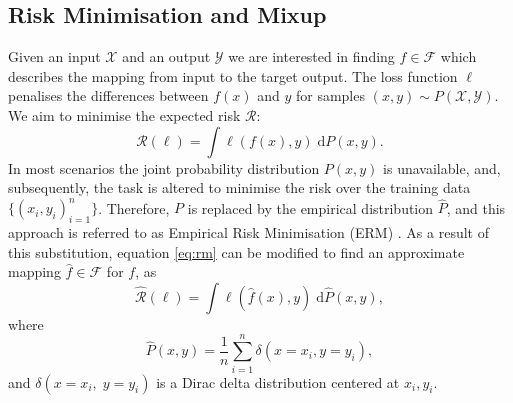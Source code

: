 \documentclass{article}
\begin{document}
\subsection{Risk Minimisation and Mixup}
Given an input $\mathcal{X}$ and an output $\mathcal{Y}$ we are interested in finding $f \in \mathcal{F}$ which describes the mapping from input to the target output. The loss function $\ell$ penalises the differences between $f(x)$ and $y$ for samples $(x, y) \sim P(\mathcal{X}, \mathcal{Y})$. We aim to minimise the expected risk $\mathcal{R}$:
\begin{equation}
\mathcal{R}(\ell) = \int \ell(f(x), y)\; \mathrm{d}P(x, y).
\label{eq:rm}
\end{equation}
In most scenarios the joint probability distribution $P(x,y)$ is unavailable, and, subsequently, the task is altered to minimise the risk over the training data $\{(x_i,y_i)_{i=1}^{n}\}$. Therefore, $P$
is replaced by the empirical distribution $\hat{P}$, and this approach is referred to as Empirical Risk Minimisation (ERM) \cite{erm}. As a result of this substitution, equation \eqref{eq:rm} can be modified to find an approximate mapping $\hat{f} \in \mathcal{F}$ for $f$, as
\begin{equation}
\hat{\mathcal{R}}(\ell) = \int \ell(\hat{f}(x), y)\; \mathrm{d}\hat{P}(x, y),
\label{eq:erm}
\end{equation}
where
\begin{equation}
\hat{P}(x, y) = \frac{1}{n} \sum_{i=1}^{n} \delta(x=x_i, y=y_i),
\end{equation}
and $\delta(x=x_i, \;y=y_i)$ is a Dirac delta distribution centered at $x_i, y_i$. 
\end{document}
